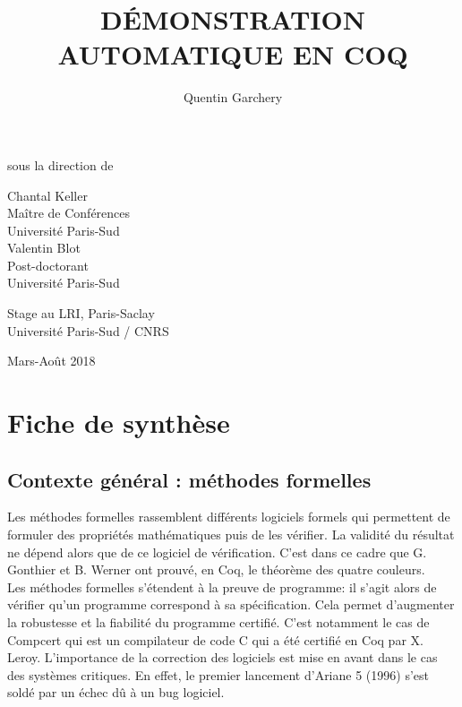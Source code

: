 \documentclass[11pt]{article}
\title{ {\Large \textbf{DÉMONSTRATION AUTOMATIQUE EN COQ}} }
\date{}
\author{Quentin Garchery}
\begin{document}
\maketitle
\thispagestyle{empty}

\begin{center}
\normalsize sous la direction de \\

\vspace{3mm}

\begin{multicols}{2}
\large Chantal Keller \\
Maître de Conférences\\
Université Paris-Sud \\

\large Valentin Blot \\
Post-doctorant\\
Université Paris-Sud
\end{multicols}

\vspace{7mm}

\Large{Stage au LRI, Paris-Saclay\\
Université Paris-Sud / CNRS \\}

\vspace{5mm}

\normalsize Mars-Août 2018

\end{center}


\vspace{3cm}


\section{Fiche de synthèse}

\subsection{Contexte général : méthodes formelles}

Les méthodes formelles rassemblent différents logiciels formels qui permettent de formuler des propriétés mathématiques puis de les vérifier. La validité du résultat ne dépend alors que de ce logiciel de vérification. C'est dans ce cadre que G. Gonthier et B. Werner ont prouvé, en Coq, le théorème des quatre couleurs.\\

Les méthodes formelles s'étendent à la preuve de programme: il s'agit alors de vérifier qu'un programme correspond à sa spécification. Cela permet d'augmenter la robustesse et la fiabilité du programme certifié. C'est notamment le cas de Compcert \cite{compcert} qui est un compilateur de code C qui a été certifié en Coq par X. Leroy. L'importance de la correction des logiciels est mise en avant dans le cas des systèmes critiques. En effet, le premier lancement d'Ariane 5 (1996) s'est soldé par un échec dû à un bug logiciel. 
\end{document}
